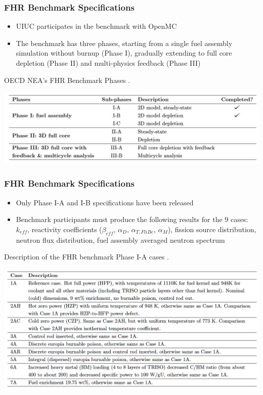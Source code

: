 \begin{frame}
    \frametitle{FHR Benchmark Specifications}
    \begin{itemize}
        \item UIUC participates in the benchmark with OpenMC
        \item The benchmark has three phases, starting from a single fuel assembly
        simulation without burnup (Phase I), gradually extending to full core depletion
        (Phase II) and multi-physics feedback (Phase III)
    \end{itemize}
    \vspace{-0.2cm}
    \begin{table}
        \caption{OECD NEA's FHR Benchmark Phases 
        \cite{petrovic_benchmark_2021}.}
        \vspace{-0.25cm}
        \includegraphics[width=0.9\linewidth]{figures/benchmark-phases.png} 
    \end{table}
\end{frame}

\begin{frame}
    \frametitle{FHR Benchmark Specifications}
    \begin{itemize}
        \item Only Phase I-A and I-B specifications have been released 
        \item Benchmark participants must produce the following results for 
        the 9 cases: $k_{eff}$, reactivity coefficients ($\beta_{eff}$, 
        $\alpha_D$, $\alpha_{T, FliBe}$, $\alpha_M$), fission source distribution, 
        neutron flux distribution, fuel assembly averaged neutron spectrum
    \end{itemize}
    \vspace{-0.25cm}
    \begin{table}
        \caption{Description of the \acrlong{FHR} benchmark Phase I-A cases 
        \vspace{-0.25cm}
        \cite{noauthor_fluoride_nodate}.}
        \includegraphics[width=0.8\linewidth]{figures/benchmark-cases.png} 
    \end{table}
\end{frame}